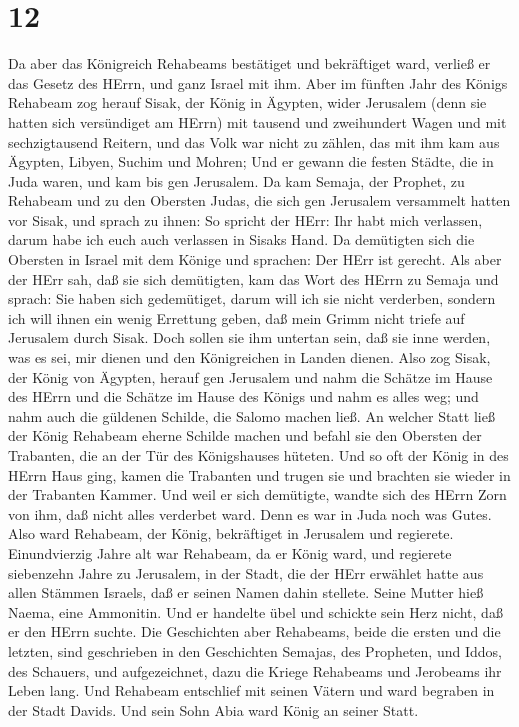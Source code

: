 \hypertarget{section-11}{%
\section{12}\label{section-11}}

 Da aber das Königreich Rehabeams bestätiget und bekräftiget
ward, verließ er das Gesetz des HErrn, und ganz Israel mit ihm.
 Aber im fünften Jahr des Königs Rehabeam zog herauf Sisak,
der König in Ägypten, wider Jerusalem (denn sie hatten sich versündiget
am HErrn)  mit tausend und zweihundert Wagen und mit
sechzigtausend Reitern, und das Volk war nicht zu zählen, das mit ihm
kam aus Ägypten, Libyen, Suchim und Mohren;  Und er gewann
die festen Städte, die in Juda waren, und kam bis gen Jerusalem.
 Da kam Semaja, der Prophet, zu Rehabeam und zu den Obersten
Judas, die sich gen Jerusalem versammelt hatten vor Sisak, und sprach zu
ihnen: So spricht der HErr: Ihr habt mich verlassen, darum habe ich euch
auch verlassen in Sisaks Hand.  Da demütigten sich die
Obersten in Israel mit dem Könige und sprachen: Der HErr ist gerecht.
 Als aber der HErr sah, daß sie sich demütigten, kam das
Wort des HErrn zu Semaja und sprach: Sie haben sich gedemütiget, darum
will ich sie nicht verderben, sondern ich will ihnen ein wenig Errettung
geben, daß mein Grimm nicht triefe auf Jerusalem durch Sisak.
 Doch sollen sie ihm untertan sein, daß sie inne werden, was
es sei, mir dienen und den Königreichen in Landen dienen. 
Also zog Sisak, der König von Ägypten, herauf gen Jerusalem und nahm die
Schätze im Hause des HErrn und die Schätze im Hause des Königs und nahm
es alles weg; und nahm auch die güldenen Schilde, die Salomo machen
ließ.  An welcher Statt ließ der König Rehabeam eherne
Schilde machen und befahl sie den Obersten der Trabanten, die an der Tür
des Königshauses hüteten.  Und so oft der König in des
HErrn Haus ging, kamen die Trabanten und trugen sie und brachten sie
wieder in der Trabanten Kammer.  Und weil er sich
demütigte, wandte sich des HErrn Zorn von ihm, daß nicht alles verderbet
ward. Denn es war in Juda noch was Gutes.  Also ward
Rehabeam, der König, bekräftiget in Jerusalem und regierete.
Einundvierzig Jahre alt war Rehabeam, da er König ward, und regierete
siebenzehn Jahre zu Jerusalem, in der Stadt, die der HErr erwählet hatte
aus allen Stämmen Israels, daß er seinen Namen dahin stellete. Seine
Mutter hieß Naema, eine Ammonitin.  Und er handelte übel
und schickte sein Herz nicht, daß er den HErrn suchte.  Die
Geschichten aber Rehabeams, beide die ersten und die letzten, sind
geschrieben in den Geschichten Semajas, des Propheten, und Iddos, des
Schauers, und aufgezeichnet, dazu die Kriege Rehabeams und Jerobeams ihr
Leben lang.  Und Rehabeam entschlief mit seinen Vätern und
ward begraben in der Stadt Davids. Und sein Sohn Abia ward König an
seiner Statt.

